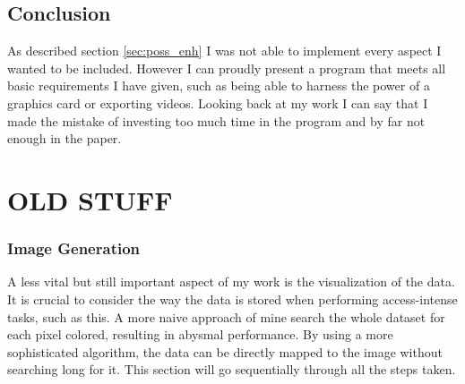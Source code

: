 \documentclass[10pt,a4paper,titlepage]{article}
\begin{document}
	\subsection{Conclusion}
	As described section \ref{sec:poss_enh} I was not able to implement every aspect I wanted to be included. However I can proudly present a program that meets all basic requirements I have given, such as being able to harness the power of a graphics card or exporting videos. Looking back at my work I can say that I made the mistake of investing too much time in the program and by far not enough in the paper.
	\clearpage
	\appendix
	\printbibliography
	
	
	
	
	
	
	
	
	
	
	
	
	
	
	
	
	
	
	
	
	
	
	
	\iffalse%
	\section{OLD STUFF}
	\subsubsection{Image Generation}
	A less vital but still important aspect of my work is the visualization of the data. It is crucial to consider the way the data is stored when performing access-intense tasks, such as this. A more naive approach of mine search the whole dataset for each pixel colored, resulting in abysmal performance. By using a more sophisticated algorithm, the data can be directly mapped to the image without searching long for it. This section will go sequentially through all the steps taken.
\end{document}
